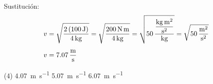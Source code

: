 \documentclass[12pt, letter]{exam}
\begin{document}
\begin{questions}
    Sustitución:
    \begin{align*}
    v &= \sqrt{\dfrac{2 \left( \SI{100}{\joule} \right)}{\SI{4}{\kilo\gram}}} = \sqrt{\dfrac{\SI{200}{\newton\meter}}{\SI{4}{\kilo\gram}}} = \sqrt{50 \, \dfrac{\displaystyle \unit[per-mode=fraction]{\kilo\gram\square\meter\per\square\second}}{\unit{\kilo\gram}}} = \sqrt{\SI[per-mode=fraction]{50}{\square\meter\per\square\second}} \\[0.5em]
    v &= \SI[per-mode=fraction]{7.07}{\meter\per\second}
    \end{align*}
    \begin{tasks}(4)
        \task \SI{4.07}{\meter\per\second}
        \task \SI{5.07}{\meter\per\second}
        \task \SI{6.07}{\meter\per\second}
        \task {}
    \end{tasks}





\end{questions}
\end{document}
